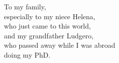 \null\vfil
{\large
\begin{center}
To my family,\\\vspace{12pt}
especially to my niece Helena, \\\vspace{12pt}
who just came to this world, \\\vspace{12pt}
and my grandfather Ludgero, \\\vspace{12pt}
who passed away while I was abroad \\\vspace{12pt}
doing my PhD. 
\end{center}}
\vfil\null
